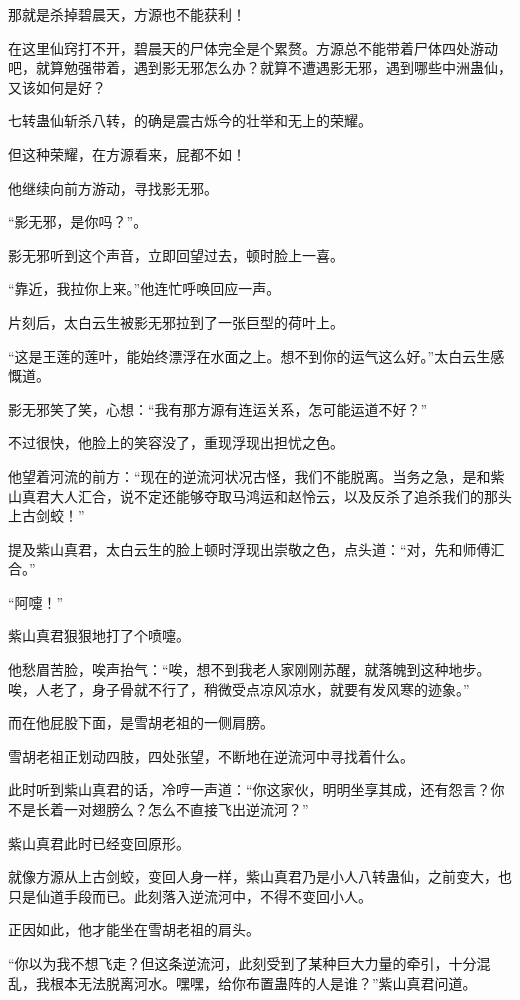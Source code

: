 \begin{this_body}
那就是杀掉碧晨天，方源也不能获利！

在这里仙窍打不开，碧晨天的尸体完全是个累赘。方源总不能带着尸体四处游动吧，就算勉强带着，遇到影无邪怎么办？就算不遭遇影无邪，遇到哪些中洲蛊仙，又该如何是好？

七转蛊仙斩杀八转，的确是震古烁今的壮举和无上的荣耀。

但这种荣耀，在方源看来，屁都不如！

他继续向前方游动，寻找影无邪。

“影无邪，是你吗？”。

影无邪听到这个声音，立即回望过去，顿时脸上一喜。

“靠近，我拉你上来。”他连忙呼唤回应一声。

片刻后，太白云生被影无邪拉到了一张巨型的荷叶上。

“这是王莲的莲叶，能始终漂浮在水面之上。想不到你的运气这么好。”太白云生感慨道。

影无邪笑了笑，心想：“我有那方源有连运关系，怎可能运道不好？”

不过很快，他脸上的笑容没了，重现浮现出担忧之色。

他望着河流的前方：“现在的逆流河状况古怪，我们不能脱离。当务之急，是和紫山真君大人汇合，说不定还能够夺取马鸿运和赵怜云，以及反杀了追杀我们的那头上古剑蛟！”

提及紫山真君，太白云生的脸上顿时浮现出崇敬之色，点头道：“对，先和师傅汇合。”

“阿嚏！”

紫山真君狠狠地打了个喷嚏。

他愁眉苦脸，唉声抬气：“唉，想不到我老人家刚刚苏醒，就落魄到这种地步。唉，人老了，身子骨就不行了，稍微受点凉风凉水，就要有发风寒的迹象。”

而在他屁股下面，是雪胡老祖的一侧肩膀。

雪胡老祖正划动四肢，四处张望，不断地在逆流河中寻找着什么。

此时听到紫山真君的话，冷哼一声道：“你这家伙，明明坐享其成，还有怨言？你不是长着一对翅膀么？怎么不直接飞出逆流河？”

紫山真君此时已经变回原形。

就像方源从上古剑蛟，变回人身一样，紫山真君乃是小人八转蛊仙，之前变大，也只是仙道手段而已。此刻落入逆流河中，不得不变回小人。

正因如此，他才能坐在雪胡老祖的肩头。

“你以为我不想飞走？但这条逆流河，此刻受到了某种巨大力量的牵引，十分混乱，我根本无法脱离河水。嘿嘿，给你布置蛊阵的人是谁？”紫山真君问道。


\end{this_body}
